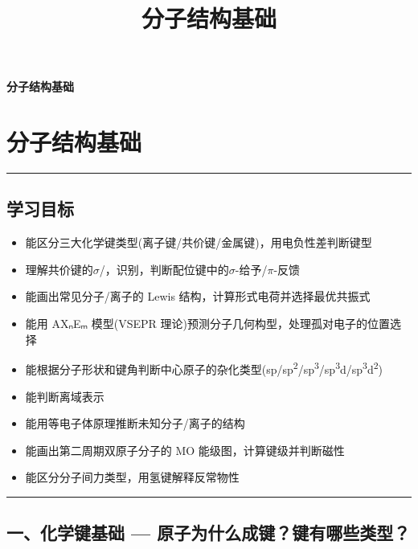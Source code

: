 \documentclass[a4paper,11pt]{ctexart}
\title{分子结构基础}
\date{}
\providecommand{\tightlist}{\setlength{\itemsep}{0pt}\setlength{\parskip}{0pt}}
\newcommand{\箭}{\ensuremath{\rightarrow}}
\newcommand{\左箭}{\ensuremath{\leftarrow}}
\newcommand{\上箭}{\ensuremath{\uparrow}}
\newcommand{\下箭}{\ensuremath{\downarrow}}
\newcommand{\衡}{\ensuremath{\rightleftharpoons}}
\newcommand{\双箭}{\ensuremath{\leftrightarrow}}
\newcommand{\约等于}{\ensuremath{\approx}}
\newcommand{\小于等于}{\ensuremath{\leq}}
\newcommand{\大于等于}{\ensuremath{\geq}}
\newcommand{\不等于}{\ensuremath{\neq}}
\newcommand{\西格马}{\ensuremath{\sigma}}
\newcommand{\派}{\ensuremath{\pi}}
\begin{document}
\thispagestyle{plain}
\begin{center}
{\bfseries 分子结构基础\par}
\end{center}
\vspace{1em}
\section{分子结构基础}\label{ux5206ux5b50ux7ed3ux6784ux57faux7840}

\begin{center}\rule{0.5\linewidth}{0.5pt}\end{center}

\subsection{学习目标}\label{ux5b66ux4e60ux76eeux6807}

\begin{itemize}
\tightlist
\item
  能区分三大化学键类型(离子键/共价键/金属键)，用电负性差判断键型
\item
  理解共价键的\西格马/，识别，判断配位键中的\西格马-给予/\派-反馈
\item
  能画出常见分子/离子的 Lewis 结构，计算形式电荷并选择最优共振式
\item
  能用 AXₙEₘ 模型(VSEPR 理论)预测分子几何构型，处理孤对电子的位置选择
\item
  能根据分子形状和键角判断中心原子的杂化类型(sp/sp\textsuperscript{2}/sp\textsuperscript{3}/sp\textsuperscript{3}d/sp\textsuperscript{3}d\textsuperscript{2})
\item
  能判断离域  表示
\item
  能用等电子体原理推断未知分子/离子的结构
\item
  能画出第二周期双原子分子的 MO 能级图，计算键级并判断磁性
\item
  能区分分子间力类型，用氢键解释反常物性
\end{itemize}

\begin{center}\rule{0.5\linewidth}{0.5pt}\end{center}

\subsection{一、化学键基础 --- 原子为什么成键？键有哪些类型？}\label{ux4e00ux5316ux5b66ux952eux57faux7840-ux539fux5b50ux4e3aux4ec0ux4e48ux6210ux952eux952eux6709ux54eaux4e9bux7c7bux578b}
\end{document}
